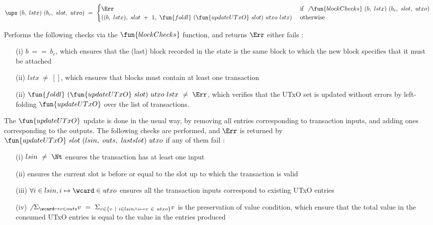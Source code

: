 \[ \ups~(b,~lstx)~(b_c,~slot,~utxo)~=~\begin{cases}
  \Err & \text{ if } \not~\fun{blockChecks}~(b,~lstx)~(b_c,~slot,~utxo) \\
  ((b,~lstx),~slot~+~1,~\fun{foldl}~(\fun{updateUTxO}~slot)~utxo~lstx) & \text{ otherwise }
\end{cases} \]

Performs the following checks via the $\fun{blockChecks}$ function, and returns $\Err$
either fails :

\begin{itemize}
  \item[(i)] $b~==~b_c$, which ensures that the (last) block recorded in the state is
  the same block to which the new block specifies that it must be attached

  \item[(ii)] $lstx~\neq~[]$, which ensures that blocks must contain at least one
  transaction

  \item[(ii)] $\fun{foldl}~(\fun{updateUTxO}~slot)~utxo~lstx~\neq~\Err$, which verifies
  that the UTxO set is updated without errors by left-folding $\fun{updateUTxO}$ over
  the list of transactions.
\end{itemize}

The $\fun{updateUTxO}$ update is done in the usual way, by removing all entries corresponding
to transaction inputs, and adding ones corresponding to the outputs. The following
checks are performed, and $\Err$ is returned by $\fun{updateUTxO}~slot~(lsin,~outs,~lastslot)~utxo$
if any of them fail :

\begin{itemize}
  \item[(i)]  $lsin ~\neq~ \Nt$ ensures the transaction has at least one input  \\

  \item[(ii)] ensures the current slot is before or equal to the slot up to which the
  transaction is valid

  \item[(iii)] $\forall i \in lsin, i \mapsto \wcard \in utxo$ ensures all the transaction
  inputs correspond to existing UTxO entries \\

  \item[(iv)] $\not~\Sigma_{\wcard \mapsto v\in outs} v~ =~\Sigma_{v\in \{v~\mid~i \in lsin \wedge  i\mapsto v~\in~utxo \}} v$
  is the preservation of value condition, which ensure that the total value in the consumed UTxO entries
  is equal to the value in the entries produced  \\

\end{itemize}

